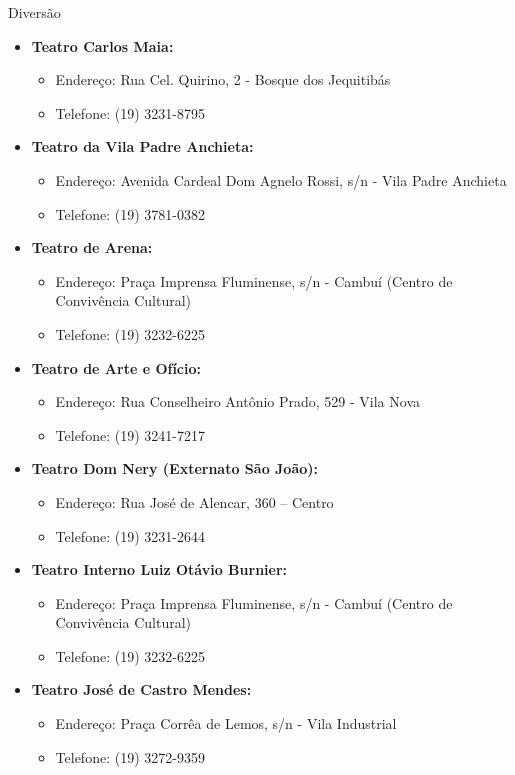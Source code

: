 \begin{story}{Diversão}
\begin{itemize}
\item \textbf{Teatro Carlos Maia:}
\begin{itemize}
\item Endereço: Rua Cel. Quirino, 2 - Bosque dos Jequitibás
\item Telefone: (19) 3231-8795
\end{itemize}

\item \textbf{Teatro da Vila Padre Anchieta:}
\begin{itemize}
\item Endereço: Avenida Cardeal Dom Agnelo Rossi, s/n - Vila Padre Anchieta
\item Telefone: (19) 3781-0382
\end{itemize}

\item \textbf{Teatro de Arena:}
\begin{itemize}
\item Endereço: Praça Imprensa Fluminense, s/n - Cambuí (Centro de Convivência Cultural)
\item Telefone: (19) 3232-6225
\end{itemize}

\item \textbf{Teatro de Arte e Ofício:}
\begin{itemize}
\item Endereço: Rua Conselheiro Antônio Prado, 529 - Vila Nova
\item Telefone: (19) 3241-7217 
\end{itemize}

\item \textbf{Teatro Dom Nery (Externato São João):}
\begin{itemize}
\item Endereço: Rua José de Alencar, 360 – Centro
\item Telefone: (19) 3231-2644
\end{itemize}

\item \textbf{Teatro Interno Luiz Otávio Burnier:}
\begin{itemize}
\item Endereço: Praça Imprensa Fluminense, s/n - Cambuí (Centro de Convivência Cultural)
\item Telefone: (19) 3232-6225
\end{itemize}

\item \textbf{Teatro José de Castro Mendes:}
\begin{itemize}
\item Endereço: Praça Corrêa de Lemos, s/n - Vila Industrial
\item Telefone: (19) 3272-9359
\end{itemize}


\end{itemize}
\end{story}
